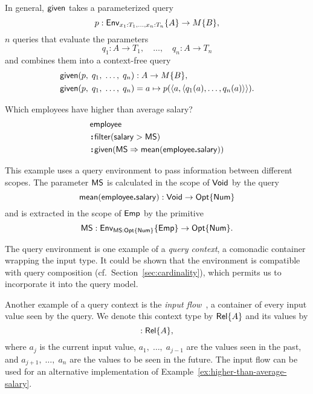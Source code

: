 In general, $\mathsf{given}$ takes a parameterized query
\begin{equation*}
    p : \mathsf{Env}_{x_1:T_1,\ldots,x_n:T_n}{\left\{A\right\}} \to M{\left\{B\right\}},
\end{equation*}
$n$ queries that evaluate the parameters
\begin{equation*}
    q_1 : A \to T_1,\quad \ldots,\quad q_n : A \to T_n
\end{equation*}
and combines them into a context-free query
\begin{align*}
    & \mathsf{given}(p,\; q_1,\; \ldots,\; q_n) : A \to M{\left\{B\right\}}, \\
    & \mathsf{given}(p,\; q_1,\; \ldots,\; q_n) = a \mapsto p(\langle a, \langle q_1(a), \ldots, q_n(a) \rangle \rangle).
\end{align*}

\begin{demo}
    \label{ex:higher-than-average-salary}
    Which employees have higher than average salary?
    \begin{align*}
        & \mathsf{employee} \\
        & \!\boldsymbol{:}\!\mathsf{filter}(\mathsf{salary} > \mathsf{MS}) \\
        & \!\boldsymbol{:}\!\mathsf{given}(\mathsf{MS} \Rightarrow \mathsf{mean}(\mathsf{employee}\boldsymbol{.}\mathsf{salary}))
    \end{align*}
\end{demo}

This example uses a query environment to pass information between different
scopes.  The parameter $\mathsf{MS}$ is calculated in the scope of $\mathsf{Void}$ by
the query
\begin{equation*}
    \mathsf{mean}(\mathsf{employee}\boldsymbol{.}\mathsf{salary}) : \mathsf{Void} \to \mathsf{Opt}{\left\{\mathsf{Num}\right\}}
\end{equation*}
and is extracted in the scope of $\mathsf{Emp}$ by the primitive
\begin{equation*}
    \mathsf{MS} : \mathsf{Env}_{\mathsf{MS}:\mathsf{Opt}{\left\{\mathsf{Num}\right\}}}{\left\{\mathsf{Emp}\right\}} \to \mathsf{Opt}{\left\{\mathsf{Num}\right\}}.
\end{equation*}

The query environment is one example of a \emph{query context}, a comonadic
container wrapping the input type.  It could be shown that the environment is
compatible with query composition (cf.~Section~\ref{sec:cardinality}), which
permits us to incorporate it into the query model.

Another example of a query context is the \emph{input
flow}~\cite{Uustalu2006}, a container of every input value seen by the query.
We denote this context type by $\mathsf{Rel}{\left\{A\right\}}$ and its values by
\begin{equation*}
    [a_1,\;\ldots,\selected{a_j},\;\ldots,\;a_n] : \Rel{A},
\end{equation*}
where $a_j$ is the current input value, $a_1,\;\ldots,\;a_{j-1}$ are the values
seen in the past, and $a_{j+1},\;\ldots,\;a_n$ are the values to be seen in the
future.  The input flow can be used for an alternative implementation of
Example~\ref{ex:higher-than-average-salary}.

